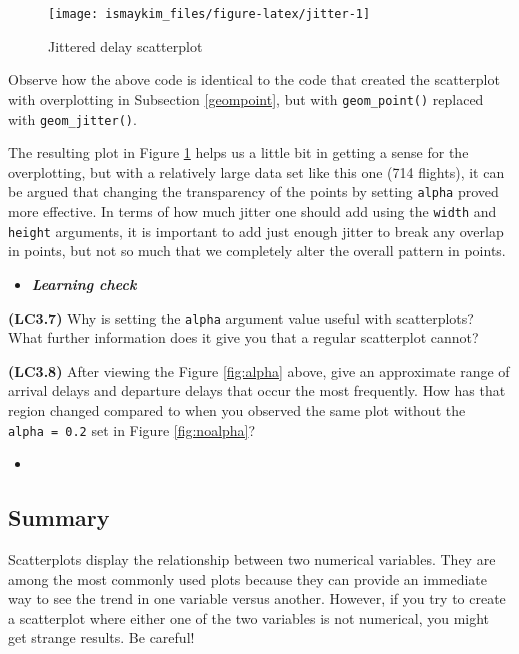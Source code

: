 \documentclass[12pt, krantz2,]{krantz}
\newenvironment{rmdblock}[1]
  {\begin{shaded*}
  \begin{itemize}
  \renewcommand{\labelitemi}{
    \raisebox{-.7\height}[0pt][0pt]{
    }
  }
  \item
  }
  {
  \end{itemize}
  \end{shaded*}
  }
\newenvironment{learncheck}
  {\begin{rmdblock}{warning}}
  {\end{rmdblock}}
\begin{document}
\begin{figure}

{\centering \texttt{[image: ismaykim\_files/figure-latex/jitter-1]} 

}

\caption{Jittered delay scatterplot}\label{fig:jitter}
\end{figure}

Observe how the above code is identical to the code that created the scatterplot with overplotting in Subsection \ref{geompoint}, but with \texttt{geom\_point()} replaced with \texttt{geom\_jitter()}.

The resulting plot in Figure \ref{fig:jitter} helps us a little bit in getting a sense for the overplotting, but with a relatively large data set like this one (714 flights), it can be argued that changing the transparency of the points by setting \texttt{alpha} proved more effective. In terms of how much jitter one should add using the \texttt{width} and \texttt{height} arguments, it is important to add just enough jitter to break any overlap in points, but not so much that we completely alter the overall pattern in points.

\begin{learncheck}
\textbf{\emph{Learning check}}
\end{learncheck}

\textbf{(LC3.7)} Why is setting the \texttt{alpha} argument value useful with scatterplots? What further information does it give you that a regular scatterplot cannot?

\textbf{(LC3.8)} After viewing the Figure \ref{fig:alpha} above, give an approximate range of arrival delays and departure delays that occur the most frequently. How has that region changed compared to when you observed the same plot without the \texttt{alpha\ =\ 0.2} set in Figure \ref{fig:noalpha}?

\begin{learncheck}

\end{learncheck}

\hypertarget{summary}{%
\subsection{Summary}\label{summary}}

Scatterplots display the relationship between two numerical variables. They are among the most commonly used plots because they can provide an immediate way to see the trend in one variable versus another. However, if you try to create a scatterplot where either one of the two variables is not numerical, you might get strange results. Be careful!
\end{document}
